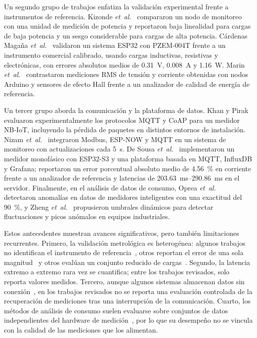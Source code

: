 Un segundo grupo de trabajos enfatiza la validación experimental frente a instrumentos de referencia.
Kizonde \textit{et~al.}~\cite{kizonde2023monitoringnode} compararon un nodo de monitoreo con una unidad de medición de potencia y reportaron baja linealidad para cargas de baja potencia y un sesgo considerable para cargas de alta potencia.
Cárdenas Magaña \textit{et~al.}~\cite{cardenas2026residential} validaron un sistema ESP32 con PZEM-004T frente a un instrumento comercial calibrado, usando cargas inductivas, resistivas y electrónicas, con errores absolutos medios de \SI{0,31}{V}, \SI{0,008}{A} y \SI{1,16}{W}.
Marin \textit{et~al.}~\cite{marin2026rmsbenchmark} contrastaron mediciones RMS de tensión y corriente obtenidas con nodos Arduino y sensores de efecto Hall frente a un analizador de calidad de energía de referencia.

Un tercer grupo aborda la comunicación y la plataforma de datos.
Khan y Pirak~\cite{khan2021mqtt} evaluaron experimentalmente los protocolos MQTT y CoAP para un medidor NB-IoT, incluyendo la pérdida de paquetes en distintos entornos de instalación.
Nizam \textit{et~al.}~\cite{nizam2024realtime} integraron Modbus, ESP-NOW y MQTT en un sistema de monitoreo con actualizaciones cada \SI{5}{s}.
De Sousa \textit{et~al.}~\cite{desousa2026smartmeter} implementaron un medidor monofásico con ESP32-S3 y una plataforma basada en MQTT, InfluxDB y Grafana; reportaron un error porcentual absoluto medio de \SI{4,56}{\percent} en corriente frente a un analizador de referencia y latencias de \SIrange{203,63}{290,86}{ms} en el servidor.
Finalmente, en el análisis de datos de consumo, Oprea \textit{et~al.}~\cite{oprea2021anomaly} detectaron anomalías en datos de medidores inteligentes con una exactitud del \SI{90}{\percent}, y Zheng \textit{et~al.}~\cite{zheng2023thresholds} propusieron umbrales dinámicos para detectar fluctuaciones y picos anómalos en equipos industriales.

Estos antecedentes muestran avances significativos, pero también limitaciones recurrentes.
Primero, la validación metrológica es heterogénea: algunos trabajos no identifican el instrumento de referencia~\cite{rohman2025esp32}, otros reportan el error de una sola magnitud~\cite{desousa2026smartmeter} y otros evalúan un conjunto reducido de cargas~\cite{rohman2025esp32}.
Segundo, la latencia extremo a extremo rara vez se cuantifica; entre los trabajos revisados, solo~\cite{desousa2026smartmeter} reporta valores medidos.
Tercero, aunque algunos sistemas almacenan datos sin conexión~\cite{kizonde2023monitoringnode}, en los trabajos revisados no se reporta una evaluación controlada de la recuperación de mediciones tras una interrupción de la comunicación.
Cuarto, los métodos de análisis de consumo suelen evaluarse sobre conjuntos de datos independientes del hardware de medición~\cite{oprea2021anomaly,zheng2023thresholds}, por lo que su desempeño no se vincula con la calidad de las mediciones que los alimentan.

